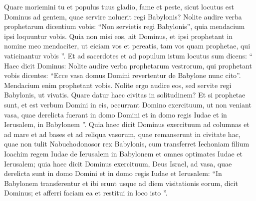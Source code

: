 \begin{biblechapter}
\begin{biblechapter}
\begin{biblechapter}
\begin{biblechapter}
\begin{biblechapter}
\begin{biblechapter}
\begin{biblechapter}
\begin{biblechapter}
\begin{biblechapter}
\begin{biblechapter}
\begin{biblechapter}
\begin{biblechapter}
\begin{biblechapter}
\begin{biblechapter}
\begin{biblechapter}
\begin{biblechapter}
\begin{biblechapter}
\begin{biblechapter}
\begin{biblechapter}
\begin{biblechapter}
\begin{biblechapter}
\begin{biblechapter}
\begin{biblechapter}
\begin{biblechapter}
\begin{biblechapter}
\begin{biblechapter}
\begin{biblechapter}
\verse Quare moriemini tu et populus tuus gladio, fame et peste, sicut locutus est Dominus ad gentem, quae servire noluerit regi Babylonis? 
\verse Nolite audire verba prophetarum dicentium vobis: “Non servietis regi Babylonis”, quia mendacium ipsi loquuntur vobis. 
\verse Quia non misi eos, ait Dominus, et ipsi prophetant in nomine meo mendaciter, ut eiciam vos et pereatis, tam vos quam prophetae, qui vaticinantur vobis ”.
 \verse Et ad sacerdotes et ad populum istum locutus sum dicens: “ Haec dicit Dominus: Nolite audire verba prophetarum vestrorum, qui prophetant vobis dicentes: “Ecce vasa domus Domini revertentur de Babylone nunc cito”. Mendacium enim prophetant vobis. 
\verse Nolite ergo audire eos, sed servite regi Babylonis, ut vivatis. Quare datur haec civitas in solitudinem? 
\verse Et si prophetae sunt, et est verbum Domini in eis, occurrant Domino exercituum, ut non veniant vasa, quae derelicta fuerant in domo Domini et in domo regis Iudae et in Ierusalem, in Babylonem ”. 
\verse Quia haec dicit Dominus exercituum ad columnas et ad mare et ad bases et ad reliqua vasorum, quae remanserunt in civitate hac, 
\verse quae non tulit Nabuchodonosor rex Babylonis, cum transferret Iechoniam filium Ioachim regem Iudae de Ierusalem in Babylonem et omnes optimates Iudae et Ierusalem; 
\verse quia haec dicit Dominus exercituum, Deus Israel, ad vasa, quae derelicta sunt in domo Domini et in domo regis Iudae et Ierusalem: 
\verse “In Babylonem transferentur et ibi erunt usque ad diem visitationis eorum, dicit Dominus; et afferri faciam ea et restitui in loco isto ”.
 

\end{biblechapter}
\end{biblechapter}
\end{biblechapter}
\end{biblechapter}
\end{biblechapter}
\end{biblechapter}
\end{biblechapter}
\end{biblechapter}
\end{biblechapter}
\end{biblechapter}
\end{biblechapter}
\end{biblechapter}
\end{biblechapter}
\end{biblechapter}
\end{biblechapter}
\end{biblechapter}
\end{biblechapter}
\end{biblechapter}
\end{biblechapter}
\end{biblechapter}
\end{biblechapter}
\end{biblechapter}
\end{biblechapter}
\end{biblechapter}
\end{biblechapter}
\end{biblechapter}
\end{biblechapter}
